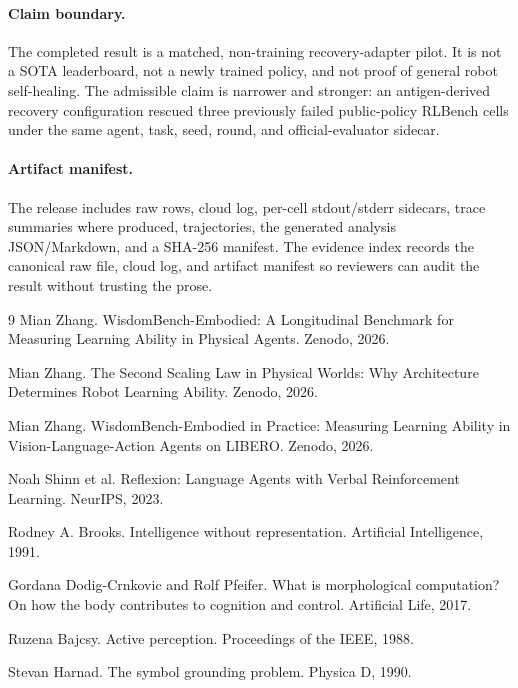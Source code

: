 \documentclass[11pt]{article}
\begin{document}
\paragraph{Claim boundary.}
The completed result is a matched, non-training recovery-adapter pilot.
It is not a SOTA leaderboard, not a newly trained policy, and not proof of general robot self-healing.
The admissible claim is narrower and stronger: an antigen-derived recovery configuration rescued three previously failed public-policy RLBench cells under the same agent, task, seed, round, and official-evaluator sidecar.

\paragraph{Artifact manifest.}
The release includes raw rows, cloud log, per-cell stdout/stderr sidecars, trace summaries where produced, trajectories, the generated analysis JSON/Markdown, and a SHA-256 manifest.
The evidence index records the canonical raw file, cloud log, and artifact manifest so reviewers can audit the result without trusting the prose.

\begin{thebibliography}{9}
Mian Zhang.
\newblock WisdomBench-Embodied: A Longitudinal Benchmark for Measuring Learning Ability in Physical Agents.
\newblock Zenodo, 2026.

Mian Zhang.
\newblock The Second Scaling Law in Physical Worlds: Why Architecture Determines Robot Learning Ability.
\newblock Zenodo, 2026.

Mian Zhang.
\newblock WisdomBench-Embodied in Practice: Measuring Learning Ability in Vision-Language-Action Agents on LIBERO.
\newblock Zenodo, 2026.

Noah Shinn et al.
\newblock Reflexion: Language Agents with Verbal Reinforcement Learning.
\newblock NeurIPS, 2023.

Rodney A. Brooks.
\newblock Intelligence without representation.
\newblock Artificial Intelligence, 1991.

Gordana Dodig-Crnkovic and Rolf Pfeifer.
\newblock What is morphological computation? On how the body contributes to cognition and control.
\newblock Artificial Life, 2017.

Ruzena Bajcsy.
\newblock Active perception.
\newblock Proceedings of the IEEE, 1988.

Stevan Harnad.
\newblock The symbol grounding problem.
\newblock Physica D, 1990.
\end{thebibliography}
\end{document}
